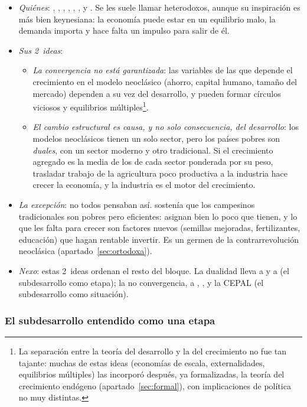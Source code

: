 \documentclass[11pt]{article}
\begin{document}
\begin{itemize}
\item \emph{Quiénes}: , , , , , ,  y . Se les suele llamar heterodoxos, aunque su inspiración es más bien keynesiana: la economía puede estar en un equilibrio malo, la demanda importa y hace falta un impulso para salir de él.
\item \emph{Sus 2~ideas}:
  \begin{itemize}
  \item \emph{La convergencia no está garantizada}: las variables de las que depende el crecimiento en el modelo neoclásico (ahorro, capital humano, tamaño del mercado) dependen a su vez del desarrollo, y pueden formar círculos viciosos y equilibrios múltiples\footnote{La separación entre la teoría del desarrollo y la del crecimiento no fue tan tajante: muchas de estas ideas (economías de escala, externalidades, equilibrios múltiples) las incorporó después, ya formalizadas, la teoría del crecimiento endógeno (apartado~\ref{sec:formal}), con implicaciones de política no muy distintas.}.
  \item \emph{El cambio estructural es causa, y no solo consecuencia, del desarrollo}: los modelos neoclásicos tienen un solo sector, pero los países pobres son \emph{duales}, con un sector moderno y otro tradicional. Si el crecimiento agregado es la media de los de cada sector ponderada por su peso, trasladar trabajo de la agricultura poco productiva a la industria hace crecer la economía, y la industria es el motor del crecimiento.
  \end{itemize}
\item \emph{La excepción}: no todos pensaban así. \textcite{Schultz1964} sostenía que los campesinos tradicionales son pobres pero eficientes: asignan bien lo poco que tienen, y lo que les falta para crecer son factores nuevos (semillas mejoradas, fertilizantes, educación) que hagan rentable invertir. Es un germen de la contrarrevolución neoclásica (apartado~\ref{sec:ortodoxa}).
\item \emph{Nexo}: estas 2~ideas ordenan el resto del bloque. La dualidad lleva a  y a  (el subdesarrollo como etapa); la no convergencia, a , ,  y la CEPAL (el subdesarrollo como situación).
\end{itemize}

\subsubsection{El subdesarrollo entendido como una etapa}\label{sec:etapa}
\end{document}

